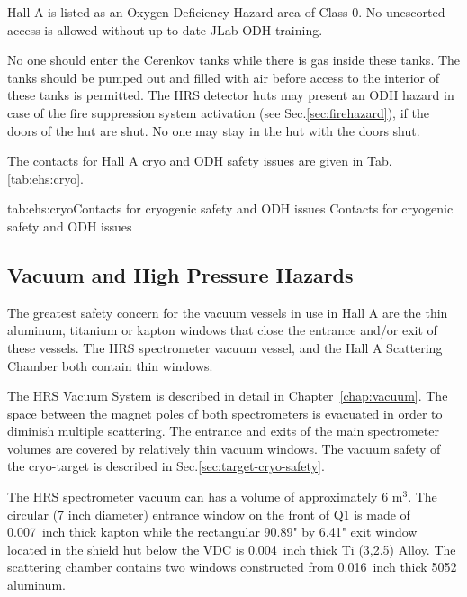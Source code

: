 Hall A is listed as an Oxygen Deficiency Hazard area of Class 0. 
No unescorted access is allowed without up-to-date JLab ODH training.

No one should enter the Cerenkov tanks while there is gas inside these tanks. 
The tanks should be pumped out and filled with air before access to the interior 
of these tanks is permitted. 
The HRS detector huts may present an ODH hazard in case of the fire suppression 
system activation (see Sec.\ref{sec:firehazard}), if the doors of the hut are shut. 
No one may stay in the hut with the doors shut.
  
 The contacts for Hall A cryo and ODH safety issues are given in Tab.\ref{tab:ehs:cryo}.
 
 \begin{namestab}{tab:ehs:cryo}{Contacts for cryogenic safety and ODH issues}{%
   Contacts for cryogenic safety and ODH issues}
 \end{namestab}

\begin{safetyen}{0}{0}
\section{Vacuum and High Pressure Hazards} 
\label{sec:vachazard}
\end{safetyen}

The greatest safety concern for the vacuum vessels in use in Hall A are the thin 
aluminum, titanium or kapton windows that close the entrance and/or exit of 
these vessels. The HRS spectrometer vacuum vessel, and the Hall A Scattering Chamber 
both contain thin windows.

The HRS Vacuum System is described in detail in Chapter~\ref{chap:vacuum}. 
The space between the magnet poles of both spectrometers is evacuated in order 
to diminish multiple scattering. The entrance and exits of the main spectrometer 
volumes are covered by relatively thin vacuum windows. 
The vacuum safety of the cryo-target is described in Sec.\ref{sec:target-cryo-safety}. 

The HRS spectrometer vacuum can has a volume of approximately 6 m$^3$.
The circular (7 inch diameter) entrance window on the front of Q1 is made of 0.007~inch thick 
kapton while the rectangular 90.89" by 6.41" exit window located in the shield hut below the VDC 
is 0.004~inch thick Ti (3,2.5) Alloy. The scattering chamber contains two windows 
constructed from 0.016~inch thick 5052 aluminum.

